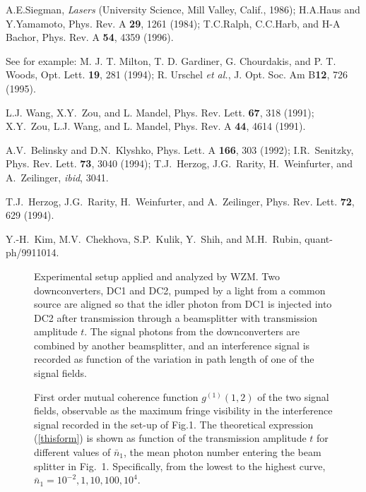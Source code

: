 \begin{multicols}{2}
\begin{references}

A.E.Siegman, {\em Lasers} (University
Science, Mill Valley, Calif., 1986); 
H.A.Haus and Y.Yamamoto, Phys. Rev. A {\bf 29}, 1261 (1984); 
T.C.Ralph, C.C.Harb, and H-A Bachor, Phys. Rev. A {\bf 54}, 4359 (1996).

See for example: M. J. T. Milton, T. D. Gardiner, G. Chourdakis, and P. 
T. Woods, Opt. Lett. {\bf 19}, 281 (1994); R. Urschel {\em et al.},
J. Opt. Soc. Am B{\bf 12}, 726 (1995). 

L.J. Wang, X.Y.~Zou, and L. Mandel,
Phys. Rev. Lett. {\bf 67}, 318 (1991);
X.Y.~Zou, L.J. Wang, and L. Mandel, Phys. Rev. A {\bf 44}, 4614 (1991).

A.V.~Belinsky and D.N.~Klyshko, Phys. Lett. A {\bf 166}, 303 (1992);
I.R.~Senitzky, Phys. Rev. Lett. {\bf 73}, 3040 (1994); T.J.~Herzog,
J.G.~Rarity, H.~Weinfurter, and A.~Zeilinger, {\it ibid}, 3041.

 T.J.~Herzog, J.G.~Rarity, H.~Weinfurter, and A.~Zeilinger,
Phys. Rev. Lett. {\bf 72}, 629 (1994).

 Y.-H.~Kim, M.V.~Chekhova, S.P.~Kulik, Y.~Shih, and
M.H.~Rubin, quant-ph/9911014.

\end{references}

\end{multicols}
\newpage \phantom{.}

\begin{figure}[htbp]
\centerline{}
\vspace{.5cm}
\caption 
{Experimental setup applied and analyzed by WZM. Two downconverters,
DC1 and DC2,
pumped by a light from a common source are aligned so that the
idler photon from DC1 is injected into DC2
after transmission through a beamsplitter with transmission amplitude
$t$. The signal photons from the downconverters are combined by
another beamsplitter, and an interference signal is recorded as function
of the variation in path length of one of the signal fields.}
\end{figure}

\begin{figure}[htbp]
\centerline{}
\vspace{.5cm}
\caption
{First order mutual coherence function $g^{(1)}(1,2)$  of the
two signal fields, observable as the maximum fringe visibility in the 
interference signal recorded in the set-up of Fig.1. The theoretical
expression (\ref{thisform}) is shown as function of the transmission amplitude
$t$ for different values of $\bar{n}_{1}$, the mean photon number 
entering the beam splitter in Fig.~1. Specifically, from the lowest to 
the highest curve,  
$\bar{n}_{1}=10^{-2}, 1, 10, 100, 10^{4}$.
}
\end{figure}


